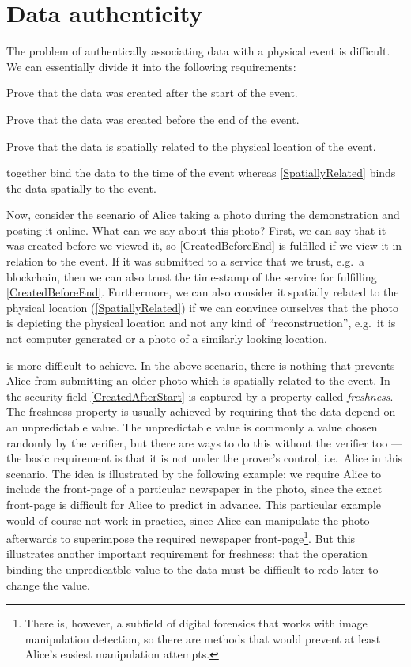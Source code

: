 \section{Data authenticity}
\label{DataAuthenticity}

The problem of authentically associating data with a physical event is 
difficult.
We can essentially divide it into the following requirements:
\begin{requirements}[A]
  \item\label{CreatedAfterStart} Prove that the data was created after the 
    start of the event.
  \item\label{CreatedBeforeEnd} Prove that the data was created before the end 
    of the event.
  \item\label{SpatiallyRelated} Prove that the data is spatially related to the 
    physical location of the event.
\end{requirements} %
 together bind the data to the time of 
the event whereas \cref{SpatiallyRelated} binds the data spatially to the 
event.

Now, consider the scenario of Alice taking a photo during the demonstration and 
posting it online.
What can we say about this photo?
First, we can say that it was created before we viewed it, so 
\cref{CreatedBeforeEnd} is fulfilled if we view it in relation to the event.
If it was submitted to a service that we trust, e.g.\ a blockchain, then we can 
also trust the time-stamp of the service for fulfilling 
\cref{CreatedBeforeEnd}.
Furthermore, we can also consider it spatially related to the physical location
(\cref{SpatiallyRelated}) if we can convince ourselves that the photo is 
depicting the physical location and not any kind of \enquote{reconstruction}, 
e.g.\ it is not computer generated or a photo of a similarly looking location.

 is more difficult to achieve.
In the above scenario, there is nothing that prevents Alice from submitting an 
older photo which is spatially related to the event.
In the security field \cref{CreatedAfterStart} is captured by a property called 
\emph{freshness}.
The freshness property is usually achieved by requiring that the data depend on
an unpredictable value.
The unpredictable value is commonly a value chosen randomly by the verifier, 
but there are ways to do this without the verifier too --- the basic 
requirement is that it is not under the prover's control, i.e.\ Alice in this 
scenario.
The idea is illustrated by the following example: we require Alice to include 
the front-page of a particular newspaper in the photo, since the exact 
front-page is difficult for Alice to predict in advance.
This particular example would of course not work in practice, since Alice can 
manipulate the photo afterwards to superimpose the required newspaper 
front-page\footnote{%
  There is, however, a subfield of digital forensics that works with image 
  manipulation detection, so there are methods that would prevent at least 
  Alice's easiest manipulation attempts.
}.
But this illustrates another important requirement for freshness: that the 
operation binding the unpredicatble value to the data must be difficult to redo 
later to change the value.
